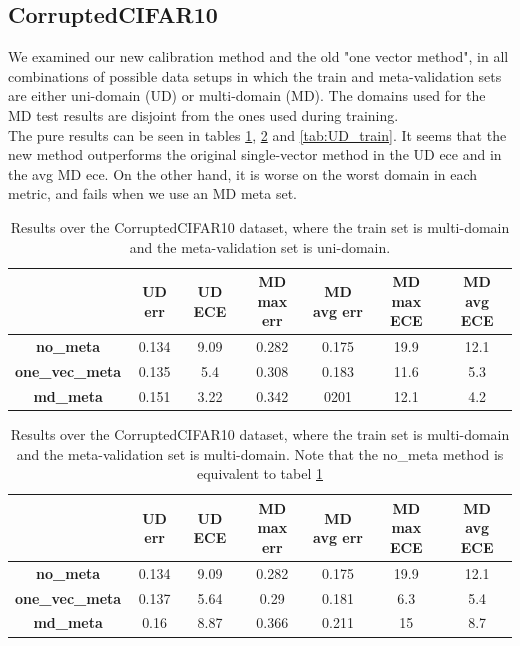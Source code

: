 \documentclass[12pt,a4paper]{article}
\begin{document}
	\subsection{CorruptedCIFAR10}
		We examined our new calibration method and the old "one vector method", in all combinations of possible data setups in which the train and meta-validation sets are either uni-domain (UD) or multi-domain (MD). The domains used for the MD test results are disjoint from the ones used during training.\\
		The pure results can be seen in tables \ref{tab:MD_train_UD_meta}, \ref{tab:MD_train_MD_meta} and \ref{tab:UD_train}. It seems that the new method outperforms the original single-vector method in the UD ece and in the avg MD ece. On the other hand, it is worse on the worst domain in each metric, and fails when we use an MD meta set.
		
		
		\begin{table}
			\centering
			\begin{tabular}{ccccccc}
				\hline
				 & \textbf{UD err} & \textbf{UD ECE} & \textbf{MD max err} & \textbf{MD avg err} & \textbf{MD max ECE} & \textbf{MD avg ECE} \\
				\hline
				\textbf{no\_meta} & 0.134 & 9.09 & 0.282 & 0.175 & 19.9 & 12.1 \\
				\textbf{one\_vec\_meta} & 0.135 & 5.4 & 0.308 & 0.183 & 11.6 & 5.3 \\
				\textbf{md\_meta} & 0.151 & 3.22 & 0.342 & 0201 & 12.1 & 4.2 \\\hline
			\end{tabular}
			\caption{Results over the CorruptedCIFAR10 dataset, where the train set is multi-domain and the meta-validation set is uni-domain.}\label{tab:MD_train_UD_meta}
		\end{table}

		\begin{table}
			\centering
			\begin{tabular}{ccccccc}
				\hline
				& \textbf{UD err} & \textbf{UD ECE} & \textbf{MD max err} & \textbf{MD avg err} & \textbf{MD max ECE} & \textbf{MD avg ECE} \\
				\hline
				\textbf{no\_meta} & 0.134 & 9.09 & 0.282 & 0.175 & 19.9 & 12.1 \\
				\textbf{one\_vec\_meta} & 0.137 & 5.64 & 0.29 & 0.181 & 6.3 & 5.4 \\
				\textbf{md\_meta} & 0.16 & 8.87 & 0.366 & 0.211 & 15 & 8.7 \\\hline
			\end{tabular}
			\caption{Results over the CorruptedCIFAR10 dataset, where the train set is multi-domain and the meta-validation set is multi-domain. Note that the no\_meta method is equivalent to tabel \ref{tab:MD_train_UD_meta}}\label{tab:MD_train_MD_meta}
		\end{table}
\end{document}
